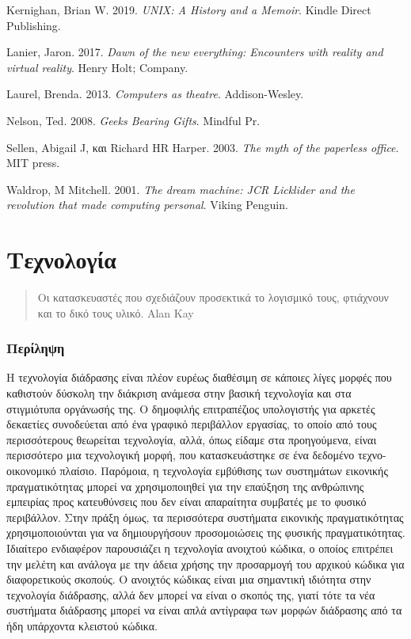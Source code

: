 \documentclass[
]{article}
\begin{document}
Kernighan, Brian W. 2019. \emph{UNIX: A History and a Memoir}. Kindle
Direct Publishing.

Lanier, Jaron. 2017. \emph{Dawn of the new everything: Encounters with
reality and virtual reality}. Henry Holt; Company.

Laurel, Brenda. 2013. \emph{Computers as theatre}. Addison-Wesley.

Nelson, Ted. 2008. \emph{Geeks Bearing Gifts}. Mindful Pr.

Sellen, Abigail J, και Richard HR Harper. 2003. \emph{The myth of the
paperless office}. MIT press.

Waldrop, M Mitchell. 2001. \emph{The dream machine: JCR Licklider and
the revolution that made computing personal}. Viking Penguin.

\hypertarget{ux3c4ux3b5ux3c7ux3bdux3bfux3bbux3bfux3b3ux3afux3b1}{%
\section{Τεχνολογία}\label{ux3c4ux3b5ux3c7ux3bdux3bfux3bbux3bfux3b3ux3afux3b1}}

\begin{quote}
Οι κατασκευαστές που σχεδιάζουν προσεκτικά το λογισμικό τους, φτιάχνουν
και το δικό τους υλικό. Alan Kay
\end{quote}

\hypertarget{ux3c0ux3b5ux3c1ux3afux3bbux3b7ux3c8ux3b7}{%
\subsubsection{Περίληψη}\label{ux3c0ux3b5ux3c1ux3afux3bbux3b7ux3c8ux3b7}}

Η τεχνολογία διάδρασης είναι πλέον ευρέως διαθέσιμη σε κάποιες λίγες
μορφές που καθιστούν δύσκολη την διάκριση ανάμεσα στην βασική τεχνολογία
και στα στιγμιότυπα οργάνωσής της. Ο δημοφιλής επιτραπέζιος υπολογιστής
για αρκετές δεκαετίες συνοδεύεται από ένα γραφικό περιβάλλον εργασίας,
το οποίο από τους περισσότερους θεωρείται τεχνολογία, αλλά, όπως είδαμε
στα προηγούμενα, είναι περισσότερο μια τεχνολογική μορφή, που
κατασκευάστηκε σε ένα δεδομένο τεχνο-οικονομικό πλαίσιο. Παρόμοια, η
τεχνολογία εμβύθισης των συστημάτων εικονικής πραγματικότητας μπορεί να
χρησιμοποιηθεί για την επαύξηση της ανθρώπινης εμπειρίας προς
κατευθύνσεις που δεν είναι απαραίτητα συμβατές με το φυσικό περιβάλλον.
Στην πράξη όμως, τα περισσότερα συστήματα εικονικής πραγματικότητας
χρησιμοποιούνται για να δημιουργήσουν προσομοιώσεις της φυσικής
πραγματικότητας. Ιδιαίτερο ενδιαφέρον παρουσιάζει η τεχνολογία ανοιχτού
κώδικα, ο οποίος επιτρέπει την μελέτη και ανάλογα με την άδεια χρήσης
την προσαρμογή του αρχικού κώδικα για διαφορετικούς σκοπούς. Ο ανοιχτός
κώδικας είναι μια σημαντική ιδιότητα στην τεχνολογία διάδρασης, αλλά δεν
μπορεί να είναι ο σκοπός της, γιατί τότε τα νέα συστήματα διάδρασης
μπορεί να είναι απλά αντίγραφα των μορφών διάδρασης από τα ήδη υπάρχοντα
κλειστού κώδικα.
\end{document}
